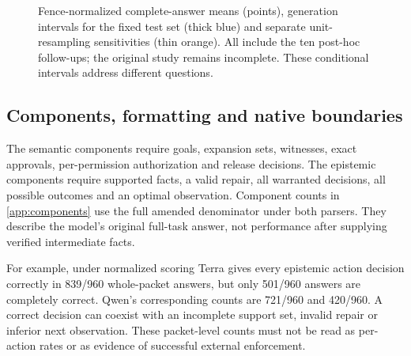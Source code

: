 \documentclass[a4paper,preprint,12pt,numbers,nopreprintline]{elsarticle}
\begin{document}
\begin{figure}[htbp]
\caption{Fence-normalized complete-answer means (points), generation intervals for the fixed test set (thick blue) and separate unit-resampling sensitivities (thin orange). All include the ten post-hoc follow-ups; the original study remains incomplete. These conditional intervals address different questions.}\label{fig:ten-pass-intervals}
\end{figure}

\subsection{Components, formatting and native boundaries}
The semantic components require goals, expansion sets, witnesses, exact approvals, per-permission authorization and release decisions. The epistemic components require supported facts, a valid repair, all warranted decisions, all possible outcomes and an optimal observation. Component counts in \ref{app:components} use the full amended denominator under both parsers. They describe the model's original full-task answer, not performance after supplying verified intermediate facts.

For example, under normalized scoring Terra gives every epistemic action decision correctly in 839/960 whole-packet answers, but only 501/960 answers are completely correct. Qwen's corresponding counts are 721/960 and 420/960. A correct decision can coexist with an incomplete support set, invalid repair or inferior next observation. These packet-level counts must not be read as per-action rates or as evidence of successful external enforcement.
\end{document}
